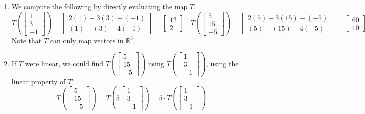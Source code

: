 \begin{SaveQuestion}
\begin{enumerate}
      \item We compute the following by directly evaluating the map $T$. 
      $$T\left(\begin{bmatrix} 1 \\ 3 \\ -1 \end{bmatrix}\right) = \begin{bmatrix} 2(1) + 3(3) - (-1) \\ (1) - (3) - 4(-1) \end{bmatrix} = \begin{bmatrix} 12 \\ 2 \end{bmatrix} \quad T\left(\begin{bmatrix} 5 \\ 15 \\ -5 \end{bmatrix}\right) = \begin{bmatrix} 2(5) + 3(15) - (-5) \\ (5) - (15) - 4(-5) \end{bmatrix} = \begin{bmatrix} 60 \\ 10 \end{bmatrix} \quad T\left(\begin{bmatrix} 1 \\ -2 \end{bmatrix}\right) = \text{ D.N.E.}$$
      Note that $T$ can only map vectors in $\mathbb{R}^3$. 
      \item If $T$ were linear, we could find $T\left(\begin{bmatrix} 5\\15\\-5 \end{bmatrix}\right)$ using $T\left(\begin{bmatrix} 1 \\ 3 \\ -1 \end{bmatrix}\right)$, using the linear property of $T$. 
      $$T\left(\begin{bmatrix} 5\\15\\-5 \end{bmatrix}\right) = T\left(5\begin{bmatrix} 1 \\ 3 \\ -1 \end{bmatrix}\right) = 5 \cdot T\left(\begin{bmatrix} 1 \\ 3 \\ -1 \end{bmatrix}\right)$$

\end{enumerate}
\end{SaveQuestion}
